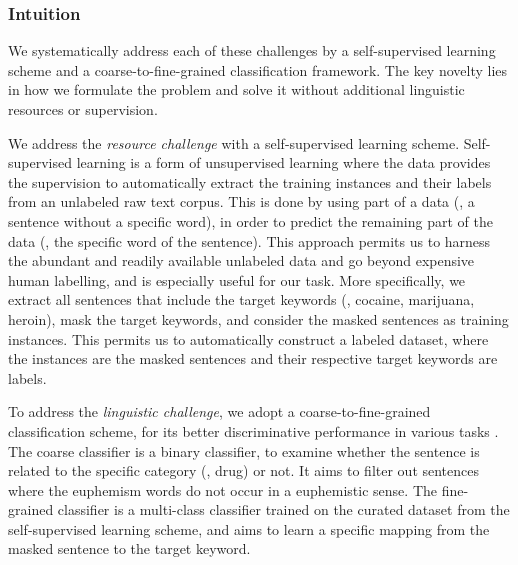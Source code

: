\subsubsection{Intuition}
\label{sec:intuition}
We systematically address each of these challenges by a self-supervised learning scheme and a coarse-to-fine-grained classification framework. 
The key novelty lies in how we formulate the problem and solve it without additional linguistic resources or supervision. 

We address the \textit{resource challenge} with a self-supervised learning scheme. 
Self-supervised learning is a form of unsupervised learning where the data provides the supervision to automatically extract the training instances and their labels from an unlabeled raw text corpus. This is done by using part of a data (\eg, a sentence without a specific word), in order to predict   the remaining part of the data (\eg, the specific word of the sentence). This approach permits us to harness the abundant and readily available unlabeled data and go beyond expensive human labelling, and is especially useful for our task.  
More specifically, we extract all sentences that include the target keywords (\eg, cocaine, marijuana, heroin), mask the target keywords, and consider the masked sentences as training instances. 
This permits us to automatically construct a labeled dataset, where the instances are the masked sentences and their respective target keywords are labels. 

To address the \textit{linguistic challenge}, we adopt a coarse-to-fine-grained classification scheme, for its better discriminative performance in various tasks \cite{huo2019coarse,liu2018global,li2019exploiting}. 
The coarse classifier is a binary classifier, to examine whether the sentence is related to the specific category (\eg, drug) or not. 
It aims to filter out sentences where the euphemism words do not occur in a euphemistic sense. 
The fine-grained classifier is a multi-class classifier trained on the curated dataset from the self-supervised learning scheme, and aims to learn a specific mapping from the masked sentence to the target keyword. 



